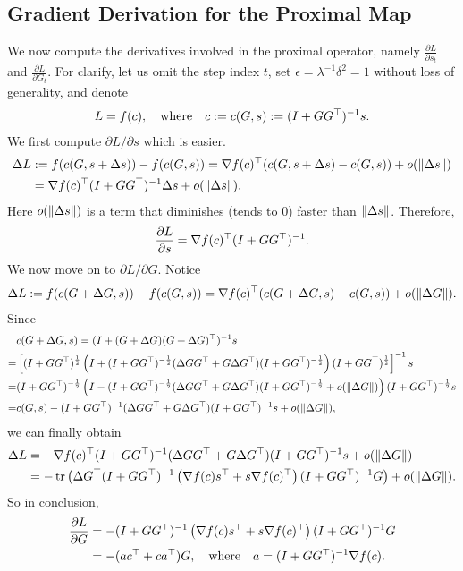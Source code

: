 \subsection{Gradient Derivation for the Proximal Map}
\label{sec:grad_prox}

We now compute the derivatives involved in the proximal operator,
namely $\frac{\partial L}{\partial s_t}$ and $\frac{\partial L}{\partial G_t}$.
For clarify, let us omit the step index $t$, 
set $\epsilon = \lambda^{-1} \delta^2 = 1$ without loss of generality, 
and denote
\begin{align}
L = f(c), {\quad \text{where} \quad} c := c(G,s) := (I + G G^\top)^{-1} s.
\end{align}
We first compute $\partial L / \partial s$ which is easier.
\begin{align}
\Delta L &:= f(c(G, s+\Delta s)) - f(c(G,s)) 
= {\nabla} f(c)^\top (c(G,s+\Delta s) - c(G,s)) + o(\left\|\Delta s\right\|)\\
&= {\nabla} f(c)^\top (I+GG^\top)^{-1} \Delta s + o(\left\|\Delta s\right\|).
\end{align}
Here $o(\left\|\Delta s\right\|)$ is a term that diminishes (tends to 0) faster than $\left\|\Delta s\right\|$.
Therefore, 
\begin{align}
\label{eq:ell_s}
\frac{\partial L}{\partial s} = {\nabla} f(c)^\top (I+GG^\top)^{-1}.
\end{align}
We now move on to $\partial L / \partial G$.
Notice
%
\begin{align}
\Delta L := f(c(G+\Delta G,s)) - f(c(G,s)) 
= {\nabla} f(c)^\top (c(G+\Delta G,s) - c(G,s)) + o(\left\|\Delta G\right\|).
\end{align}
Since
\begin{align}
&c(G+\Delta G,s) = (I+(G+\Delta G)(G + \Delta G)^\top)^{-1} s \\
= &\left[(I+GG^\top)^{\frac{1}{2}} \left(I + (I+GG^\top)^{-\frac{1}{2}} (\Delta G G^\top + G \Delta G^\top) (I+GG^\top)^{-\frac{1}{2}}\right)(I+GG^\top)^{\frac{1}{2}}\right]^{-1} s \\
= &(I+GG^\top)^{-\frac{1}{2}} \left(I - (I+GG^\top)^{-\frac{1}{2}} (\Delta G G^\top + G \Delta G^\top) (I+GG^\top)^{-\frac{1}{2}} + o(\left\|\Delta G\right\|)\right)(I+GG^\top)^{-\frac{1}{2}} s \\
= & c(G,s) - (I+GG^\top)^{-1} (\Delta G G^\top + G \Delta G^\top) (I+GG^\top)^{-1} s + o(\left\|\Delta G\right\|),
\end{align}
we can finally obtain
\begin{align}
\Delta L
&= -{\nabla} f(c)^\top (I+GG^\top)^{-1} (\Delta G G^\top + G \Delta G^\top) (I+GG^\top)^{-1} s + o(\left\|\Delta G\right\|) \\
&= -\operatorname{\mathop{\mathrm{tr}}} \left(\Delta G^\top (I+GG^\top)^{-1} \left({\nabla} f(c) s^\top + s {\nabla} f(c)^\top\right) (I+GG^\top)^{-1} G\right) + o(\left\|\Delta G\right\|).
\end{align}
So in conclusion,
\begin{align}
\frac{\partial L}{\partial G} &= - (I+GG^\top)^{-1} \left({\nabla} f(c) s^\top + s {\nabla} f(c)^\top\right) (I+GG^\top)^{-1} G \\
\label{eq:ell_G}	
&= -(a c^\top + c a^\top)G,
{\quad \text{where} \quad} a = (I+GG^\top)^{-1}{\nabla} f(c).
\end{align}

